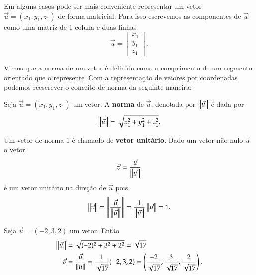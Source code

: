 Em alguns casos pode ser mais conveniente representar um vetor $\vec{u} = (x_1, y_1,z_1)$ de forma matricial. Para isso escrevemos as componentes de $\vec{u}$ como uma matriz de 1 coluna e duas linhas
\[
  \vec{u} = \begin{bmatrix}
    x_1\\y_1\\z_1
  \end{bmatrix}.
\]

Vimos que a norma de um vetor \'e definida como o comprimento de um segmento orientado que o represente. Com a representa\c{c}\~ao de vetores por coordenadas podemos reescrever o conceito de norma da seguinte maneira:
\begin{definicao}
  Seja $\vec{u} = (x_1, y_1,z_1)$ um vetor. A \textbf{norma} de $\vec{u}$, denotada por $\left\Vert{\vec{u}}\right\Vert$ \'e dada por
  \[
    \left\Vert{\vec{u}}\right\Vert = \sqrt{x_1^2 + y_1^2 + z_1^2}.
  \]
\end{definicao}

Um vetor de norma 1 \'e chamado de \textbf{vetor unit\'ario}. Dado um vetor n\~ao nulo $\vec{u}$ o vetor
\[
  \vec{v} = \dfrac{\vec{u}}{\left\Vert{\vec{u}}\right\Vert}
\]
\'e um vetor unit\'ario na dire\c{c}\~ao de $\vec{u}$ pois
\[
  \left\Vert{\vec{v}}\right\Vert = \left\Vert{\dfrac{\vec{u}}{\left\Vert{\vec{u}}\right\Vert}}\right\Vert = \dfrac{1}{\left\Vert{\vec{u}}\right\Vert}\left\Vert{\vec{u}}\right\Vert = 1.
\]

\begin{exemplo}
  Seja $\vec{u} = (-2,3,2)$ um vetor. Ent\~ao
  \begin{align*}
    \left\Vert{\vec{u}}\right\Vert &= \sqrt{(-2)^2 + 3^2 + 2^2} = \sqrt{17}\\
    \vec{v} &= \dfrac{\vec{u}}{\left\Vert{u}\right\Vert} = \dfrac{1}{\sqrt{17}}(-2,3,2) = \left(\dfrac{-2}{\sqrt{17}}, \dfrac{3}{\sqrt{17}}, \dfrac{2}{\sqrt{17}}\right).
  \end{align*}
\end{exemplo}

